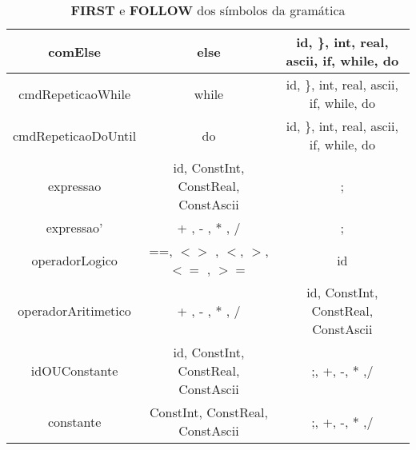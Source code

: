 \documentclass[11pt]{article}
\begin{document}
\begin{table}[H]
\begin{tabular}{c|c|c}
        \hline
        comElse              & else                                & id, \}, int, real, ascii, if, while, do \\
        \hline
        cmdRepeticaoWhile    & while                               & id, \}, int, real, ascii, if, while, do \\
        \hline
        cmdRepeticaoDoUntil  & do                                  & id, \}, int, real, ascii, if, while, do \\
        \hline
        expressao            & id, ConstInt, ConstReal, ConstAscii & ; \\
        \hline
        expressao'           & + , - , * , /                       & ; \\
        \hline
        operadorLogico       & ==, $<>$ , $<$, $>$, $<=$ , $>=$    & id  \\
        \hline
        operadorAritimetico  &  + , - , * , /                      & id, ConstInt, ConstReal, ConstAscii \\
        \hline
        idOUConstante        & id, ConstInt, ConstReal, ConstAscii &  ;, +, -, * ,/ \\
        \hline
        constante            & ConstInt, ConstReal, ConstAscii     &  ;, +, -, * ,/   \\
        \hline
    \end{tabular}
    \caption{\textbf{FIRST} e \textbf{FOLLOW} dos símbolos da gramática}
\end{table}
\end{document}
